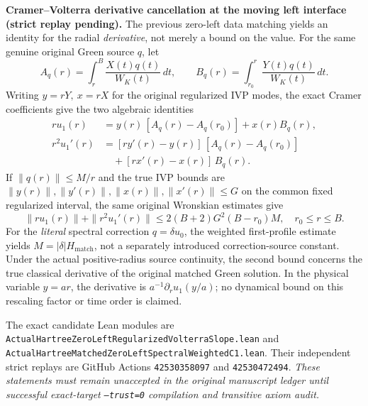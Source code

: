 \documentclass[11pt]{amsart}
\begin{document}
\medskip
\noindent\textbf{Cramer--Volterra derivative cancellation at the moving left interface (strict replay pending).}
The previous zero-left data matching yields an identity for the radial
\emph{derivative}, not merely a bound on the value. For the same genuine
original Green source \(q\), let
\[
 A_q(r)=\int_r^B \frac{X(t)q(t)}{W_K(t)}\,dt,\qquad
 B_q(r)=\int_{r_0}^r \frac{Y(t)q(t)}{W_K(t)}\,dt.
\]
Writing \(y=rY,\ x=rX\) for the original regularized IVP modes,
the exact Cramer coefficients give the two algebraic identities
\[
 \begin{aligned}
 r u_1(r)&=y(r)\,[A_q(r)-A_q(r_0)]+x(r)B_q(r),\\
 r^2 u_1'(r)&=
 [r y'(r)-y(r)]\,[A_q(r)-A_q(r_0)]\\
 &\quad+[r x'(r)-x(r)]\,B_q(r).
 \end{aligned}
\]
If \(\|q(r)\|\le M/r\) and the true IVP bounds are
\(
\|y(r)\|,\|y'(r)\|,\|x(r)\|,\|x'(r)\|\le G
\)
on the common fixed regularized interval, the same original Wronskian
estimates give
\[
 \boxed{
 \|r u_1(r)\|+\|r^2 u_1'(r)\|
 \le 2(B+2)G^2(B-r_0)M,\quad r_0\le r\le B.}
\]
For the \emph{literal} spectral correction \(q=\delta u_0\),
the weighted first-profile estimate yields
\(M=|\delta|H_{\mathrm{match}}\), not a separately introduced
correction-source constant. Under the actual positive-radius source
continuity, the second bound concerns the true classical derivative
of the original matched Green solution. In the physical variable
\(y=ar\), the derivative is \(a^{-1}\partial_r u_1(y/a)\);
no dynamical bound on this rescaling factor or time order is claimed.

The exact candidate Lean modules are
\texttt{ActualHartreeZeroLeftRegularizedVolterraSlope.lean}
and \texttt{ActualHartreeMatchedZeroLeftSpectralWeightedC1.lean}.
Their independent strict replays are GitHub Actions
\texttt{42530358097} and \texttt{42530472494}.
\emph{These statements must remain unaccepted in the original
manuscript ledger until successful exact-target \texttt{--trust=0}
compilation and transitive axiom audit.}
\end{document}
